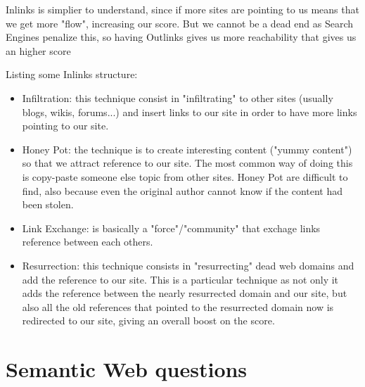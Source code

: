 Inlinks is simplier to understand, since if more sites are pointing to us means that we get more "flow", increasing our score. But we cannot be a dead end as Search Engines penalize this, so having Outlinks gives us more reachability that gives us an higher score

Listing some Inlinks structure:
\begin{itemize}
    \item Infiltration: this technique consist in "infiltrating" to other sites (usually blogs, wikis, forums...) and insert links to our site in order to have more links pointing to our site.
    \item Honey Pot: the technique is to create interesting content ("yummy content") so that we attract reference to our site. The most common way of doing this is copy-paste someone else topic from other sites. Honey Pot are difficult to find, also because even the original author cannot know if the content had been stolen.   
    \item Link Exchange: is basically a "force"/"community" that exchage links reference between each others.
    \item Resurrection: this technique consists in "resurrecting" dead web domains and add the reference to our site. This is a particular technique as not only it adds the reference between the nearly resurrected domain and our site, but also all the old references that pointed to the resurrected domain now is redirected to our site, giving an overall boost on the score.
\end{itemize}

\section{Semantic Web questions}
